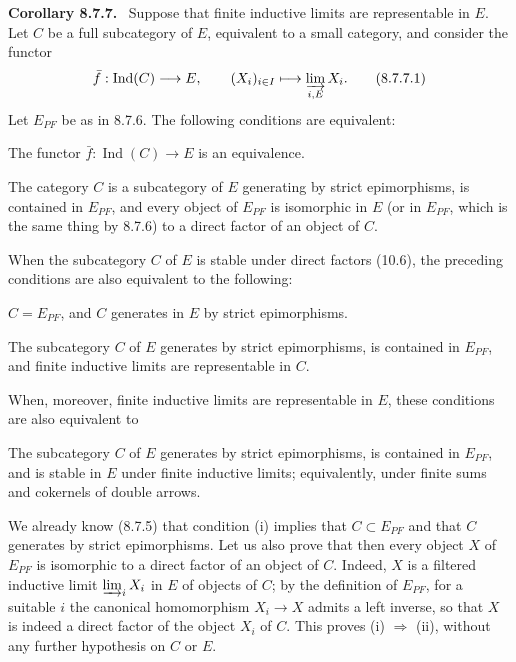 \documentclass[11pt]{article}
\newcommand{\Ind}{\operatorname{Ind}}
\newenvironment{statement}[1]{\par\medskip\noindent\textbf{#1.}\ }{\par\medskip}
\begin{document}
\begin{statement}{Corollary 8.7.7}
Suppose that finite inductive limits are representable in $E$. Let $C$ be a full subcategory of $E$, equivalent to a small category, and consider the functor
\[
 \bar f:\Ind(C)\longrightarrow E,
\qquad
 (X_i)_{i\in I}\longmapsto \varinjlim_{i,E}X_i.
\tag{8.7.7.1}
\]
Let $E_{PF}$ be as in 8.7.6. The following conditions are equivalent:
\begin{description}[leftmargin=2.8em]
\item[\rm(i)] The functor $\bar f:\Ind(C)\to E$ is an equivalence.
\item[\rm(ii)] The category $C$ is a subcategory of $E$ generating by strict epimorphisms, is contained in $E_{PF}$, and every object of $E_{PF}$ is isomorphic in $E$ (or in $E_{PF}$, which is the same thing by 8.7.6) to a direct factor of an object of $C$.
\end{description}
When the subcategory $C$ of $E$ is stable under direct factors (10.6), the preceding conditions are also equivalent to the following:
\begin{description}[leftmargin=2.8em]
\item[\rm(ii bis)] $C=E_{PF}$, and $C$ generates in $E$ by strict epimorphisms.
\item[\rm(iii)] The subcategory $C$ of $E$ generates by strict epimorphisms, is contained in $E_{PF}$, and finite inductive limits are representable in $C$.
\end{description}
When, moreover, finite inductive limits are representable in $E$, these conditions are also equivalent to
\begin{description}[leftmargin=2.8em]
\item[\rm(iii bis)] The subcategory $C$ of $E$ generates by strict epimorphisms, is contained in $E_{PF}$, and is stable in $E$ under finite inductive limits; equivalently, under finite sums and cokernels of double arrows.
\end{description}
\end{statement}

We already know (8.7.5) that condition (i) implies that $C\subset E_{PF}$ and that $C$ generates by strict epimorphisms. Let us also prove that then every object $X$ of $E_{PF}$ is isomorphic to a direct factor of an object of $C$. Indeed, $X$ is a filtered inductive limit $\varinjlim_iX_i$ in $E$ of objects of $C$; by the definition of $E_{PF}$, for a suitable $i$ the canonical homomorphism $X_i\to X$ admits a left inverse, so that $X$ is indeed a direct factor of the object $X_i$ of $C$. This proves (i) $\Rightarrow$ (ii), without any further hypothesis on $C$ or $E$.
\end{document}
